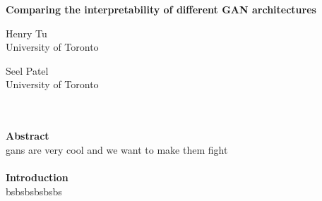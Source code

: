 \documentclass[12pt]{article}
\begin{document}
\begin{center}
    \textbf{Comparing the interpretability of different GAN architectures}
\end{center}
\begin{minipage}{.5\textwidth}
            \centering
            Henry Tu\\
            University of Toronto
\end{minipage}
\begin{minipage}{.5\textwidth}
            \centering
            Seel Patel\\
            University of Toronto
\end{minipage}
\\\\
\textbf{Abstract}\\
gans are very cool and we want to make them fight\\\\
\textbf{Introduction}\\
bsbsbsbsbsbs
\end{document}

